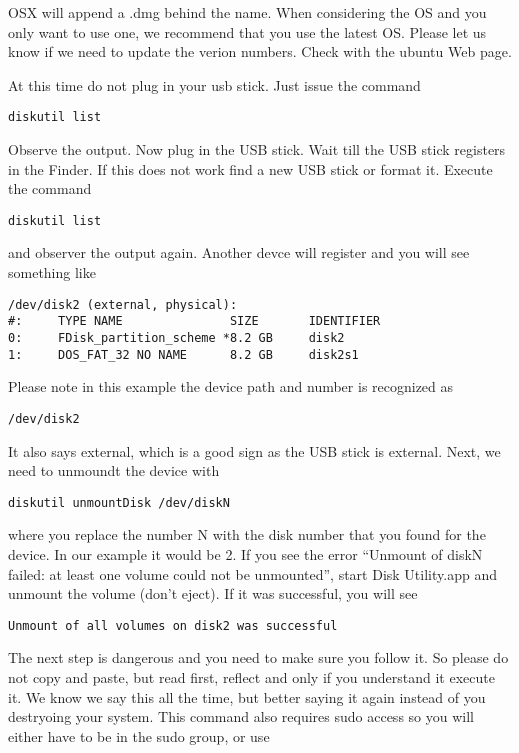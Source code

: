 OSX will append a .dmg behind the name. When considering the OS and you
only want to use one, we recommend that you use the latest OS. Please
let us know if we need to update the verion numbers. Check with the
ubuntu Web page.

At this time do not plug in your usb stick. Just issue the command

\begin{lstlisting}
diskutil list
\end{lstlisting}

Observe the output. Now plug in the USB stick. Wait till the USB stick
registers in the Finder. If this does not work find a new USB stick or
format it. Execute the command

\begin{lstlisting}
diskutil list
\end{lstlisting}

and observer the output again. Another devce will register and you will
see something like

\begin{lstlisting}
/dev/disk2 (external, physical):
#:     TYPE NAME               SIZE       IDENTIFIER
0:     FDisk_partition_scheme *8.2 GB     disk2
1:     DOS_FAT_32 NO NAME      8.2 GB     disk2s1
\end{lstlisting}

Please note in this example the device path and number is recognized as

\begin{lstlisting}
/dev/disk2
\end{lstlisting}

It also says external, which is a good sign as the USB stick is
external. Next, we need to unmoundt the device with

\begin{lstlisting}
diskutil unmountDisk /dev/diskN
\end{lstlisting}

where you replace the number N with the disk number that you found for
the device. In our example it would be 2. If you see the error ``Unmount
of diskN failed: at least one volume could not be unmounted'', start
Disk Utility.app and unmount the volume (don't eject). If it was
successful, you will see

\begin{lstlisting}
Unmount of all volumes on disk2 was successful
\end{lstlisting}

The next step is dangerous and you need to make sure you follow it. So
please do not copy and paste, but read first, reflect and only if you
understand it execute it. We know we say this all the time, but better
saying it again instead of you destryoing your system. This command also
requires sudo access so you will either have to be in the sudo group, or
use

